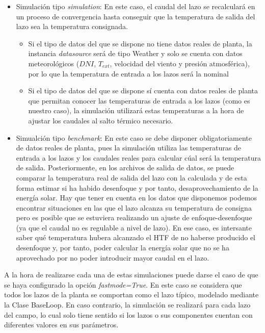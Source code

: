 \documentclass[12pt]{report} %
\begin{document}
\begin{itemize}
\item
  Simulación tipo \emph{simulation}: En este caso, el caudal del lazo se   recalculará en un proceso de convergencia hasta conseguir que la   temperatura de salida del lazo sea la temperatura consignada.

  \begin{itemize}
  \item
    Si el tipo de datos del que se dispone no tiene datos reales de  planta, la instancia \emph{datasource} será de tipo Weather y solo   se cuenta con datos meteorológicos (\(DNI\), \(T_{ext}\), velocidad
    del viento y presión atmosférica), por lo que la temperatura de   entrada a los lazos será la nominal
  \item
    Si el tipo de datos del que se dispone sí cuenta con datos reales de   planta que permitan conocer las temperaturas de entrada a los lazos  (como es nuestro caso), la simulación utilizará estas temperaturas a  la hora de ajustar los caudales al salto térmico necesario.
  \end{itemize}
\item
  Simualción tipo \emph{benchmark}: En este caso se debe disponer  obligatoriamente de datos reales de planta, pues la simulación utiliza  las temperaturas de entrada a los lazos y los caudales reales para calcular cúal será la temperatura de salida. Posteriormente, en los  archivos de salida de datos, se puede comparar la temperatura real de  salida del lazo con la calculada y de esta forma estimar si ha habido desenfoque y por tanto, desaprovechamiento de la energía solar. Hay
  que tener en cuenta en los datos que disponemos podemos encontrar   situaciones en las que el lazo alcanza su temperatura de consigna pero   es posible que se estuviera realizando un ajuste de enfoque-desenfoque   (ya que el caudal no es regulable a nivel de lazo). En ese caso, es   intersante saber qué temperatura hubera alcanzado el HTF de no haberse   producido el desenfoque y, por tanto, poder calcular la energía solar   que no se ha aprovechado por no poder introducir mayor caudal en el   lazo.
\end{itemize}

A la hora de realizarse cada una de estas simulaciones puede darse el caso de que se haya configurado la opción \emph{fastmode=True}. En este caso se considera que todos los lazos de la planta se comportan como el lazo típico, modelado mediante la Clase BaseLoop. En caso contrario, la simulación se realizará para cada lazo del campo, lo cual solo tiene sentido si los lazos o sus componentes cuentan con diferentes valores en sus parámetros. 
\end{document}
